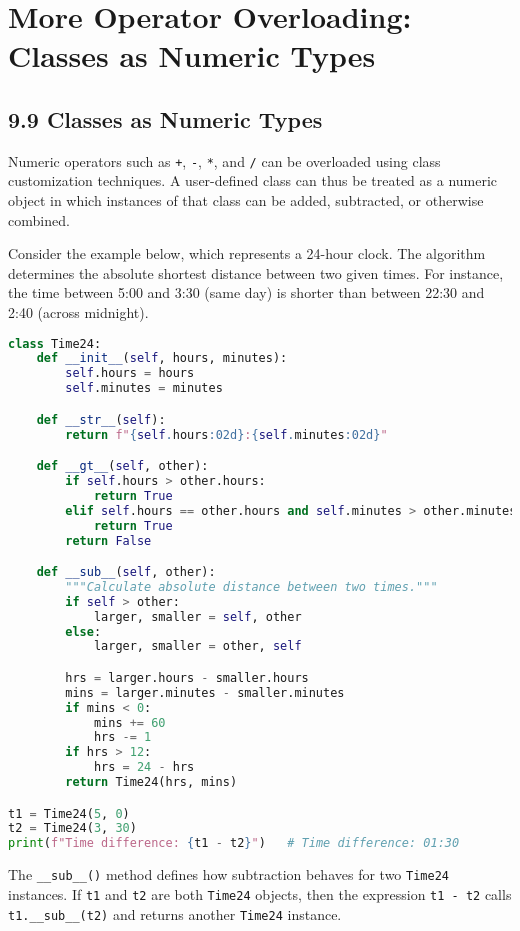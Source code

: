 \chapter{More Operator Overloading: Classes as Numeric Types}

\section{9.9 Classes as Numeric Types}

Numeric operators such as \texttt{+}, \texttt{-}, \texttt{*}, and \texttt{/} can be overloaded using class customization techniques.  
A user-defined class can thus be treated as a numeric object in which instances of that class can be added, subtracted, or otherwise combined.  

Consider the example below, which represents a 24-hour clock.  
The algorithm determines the absolute shortest distance between two given times.  
For instance, the time between 5:00 and 3:30 (same day) is shorter than between 22:30 and 2:40 (across midnight).

\begin{lstlisting}[language=Python, caption={Extending the Time class with an overloaded subtraction operator}]
class Time24:
    def __init__(self, hours, minutes):
        self.hours = hours
        self.minutes = minutes

    def __str__(self):
        return f"{self.hours:02d}:{self.minutes:02d}"

    def __gt__(self, other):
        if self.hours > other.hours:
            return True
        elif self.hours == other.hours and self.minutes > other.minutes:
            return True
        return False

    def __sub__(self, other):
        """Calculate absolute distance between two times."""
        if self > other:
            larger, smaller = self, other
        else:
            larger, smaller = other, self

        hrs = larger.hours - smaller.hours
        mins = larger.minutes - smaller.minutes
        if mins < 0:
            mins += 60
            hrs -= 1
        if hrs > 12:
            hrs = 24 - hrs
        return Time24(hrs, mins)

t1 = Time24(5, 0)
t2 = Time24(3, 30)
print(f"Time difference: {t1 - t2}")   # Time difference: 01:30
\end{lstlisting}

\noindent
The \texttt{\_\_sub\_\_()} method defines how subtraction behaves for two \texttt{Time24} instances.  
If \texttt{t1} and \texttt{t2} are both \texttt{Time24} objects, then the expression \texttt{t1 - t2}  
calls \texttt{t1.\_\_sub\_\_(t2)} and returns another \texttt{Time24} instance.

